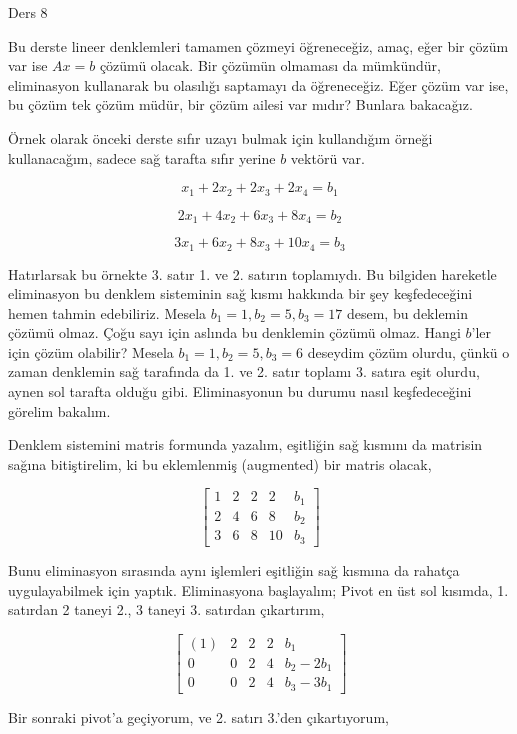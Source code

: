 \documentclass[12pt,fleqn]{article}\usepackage{../../common}
\begin{document}
Ders 8

Bu derste lineer denklemleri tamamen çözmeyi öğreneceğiz, amaç, eğer bir
çözüm var ise $Ax=b$ çözümü olacak. Bir çözümün olmaması da mümkündür,
eliminasyon kullanarak bu olasılığı saptamayı da öğreneceğiz. Eğer çözüm
var ise, bu çözüm tek çözüm müdür, bir çözüm ailesi var mıdır? Bunlara
bakacağız. 

Örnek olarak önceki derste sıfır uzayı bulmak için kullandığım örneği
kullanacağım, sadece sağ tarafta sıfır yerine $b$ vektörü var.

$$ x_1 + 2x_2 + 2x_3 + 2x_4 = b_1 $$

$$ 2x_1 + 4x_2 + 6x_3 + 8x_4 = b_2 $$

$$ 3x_1 + 6x_2 + 8x_3 + 10x_4 = b_3 $$

Hatırlarsak bu örnekte 3. satır 1. ve 2. satırın toplamıydı. Bu bilgiden
hareketle eliminasyon bu denklem sisteminin sağ kısmı hakkında bir şey
keşfedeceğini hemen tahmin edebiliriz. Mesela $b_1=1,b_2=5,b_3=17$ desem,
bu deklemin çözümü olmaz. Çoğu sayı için aslında bu denklemin çözümü
olmaz. Hangi $b$'ler için çözüm olabilir? Mesela $b_1=1,b_2=5,b_3=6$
deseydim çözüm olurdu, çünkü o zaman denklemin sağ tarafında da 1. ve
2. satır toplamı 3. satıra eşit olurdu, aynen sol tarafta olduğu
gibi. Eliminasyonun bu durumu nasıl keşfedeceğini görelim bakalım.

Denklem sistemini matris formunda yazalım, eşitliğin sağ kısmını da
matrisin sağına bitiştirelim, ki bu eklemlenmiş (augmented) bir matris
olacak, 

$$ 
\left[\begin{array}{rrrr|r}
1 & 2 & 2 & 2 & b_1 \\
2 & 4 & 6 & 8 & b_2 \\
3 & 6 & 8 & 10 & b_3
\end{array}\right]
 $$

Bunu eliminasyon sırasında aynı işlemleri eşitliğin sağ kısmına da rahatça
uygulayabilmek için yaptık. Eliminasyona başlayalım; Pivot en üst sol
kısımda, 1. satırdan 2 taneyi 2., 3 taneyi 3. satırdan çıkartırım,

$$ 
\left[\begin{array}{llll|l}
(1) & 2 & 2 & 2 & b_1 \\
0 & 0 & 2 & 4 & b_2-2b_1 \\
0 & 0 & 2 & 4 & b_3-3b_1
\end{array}\right]
 $$

Bir sonraki pivot'a geçiyorum, ve 2. satırı 3.'den çıkartıyorum,
\end{document}
